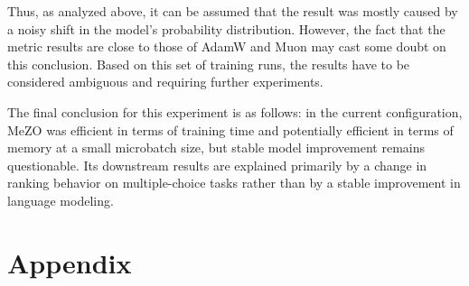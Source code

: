 \documentclass{article}
\begin{document}
Thus, as analyzed above, it can be assumed that the result was mostly caused by a noisy shift in the model's probability distribution. However, the fact that the metric results are close to those of AdamW and Muon may cast some doubt on this conclusion. Based on this set of training runs, the results have to be considered ambiguous and requiring further experiments.

The final conclusion for this experiment is as follows: in the current configuration, MeZO was efficient in terms of training time and potentially efficient in terms of memory at a small microbatch size, but stable model improvement remains questionable. Its downstream results are explained primarily by a change in ranking behavior on multiple-choice tasks rather than by a stable improvement in language modeling.
\appendix

\section{Appendix}

\clearpage
\begin{table}
\centering
\small
{}
\caption{Full downstream evaluation results.}
\label{tab:full-quality-metrics}
\end{table}
\clearpage
\end{document}
